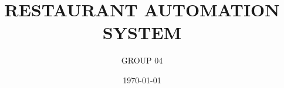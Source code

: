 \documentclass[12pt]{article}
\title{RESTAURANT AUTOMATION SYSTEM }
\author{ GROUP 04 }
\date{\today}
\begin{document}












\newpage
{
  \setlength{\parskip}{0em}
  \renewcommand\contentsname{TABLE OF CONTENTS} %
  \tableofcontents %
}




\newpage







 

\end{document}
